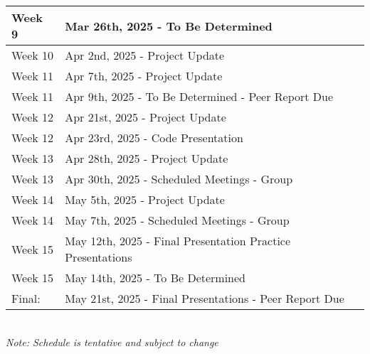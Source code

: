 \begin{tabular}{ | l | l |  }
    \hline
    Week 9 & Mar 26th, 2025 - To Be Determined \\ 
    \hline
    Week 10 & Apr 2nd, 2025 - Project Update \\ 
    \hline
    Week 11 & Apr 7th, 2025 - Project Update \\ 
    \hline
    Week 11 & Apr 9th, 2025 - To Be Determined - Peer Report Due \\ 
    \hline
    Week 12 & Apr 21st, 2025 - Project Update \\
    \hline
    Week 12 & Apr 23rd, 2025 - Code Presentation \\
    \hline
    Week 13 & Apr 28th, 2025 - Project Update \\
    \hline
    Week 13 & Apr 30th, 2025 - Scheduled Meetings - Group \\
    \hline
    Week 14 & May 5th, 2025 - Project Update \\
    \hline
    Week 14 & May 7th, 2025 - Scheduled Meetings - Group \\
    \hline
    Week 15 & May 12th, 2025 - Final Presentation Practice Presentations \\
    \hline
    Week 15 & May 14th, 2025 - To Be Determined \\
    \hline
    Final: & May 21st, 2025 - Final Presentations - Peer Report Due \\
    \hline
\end{tabular}
\\
\textit{Note: Schedule is tentative and subject to change}
    